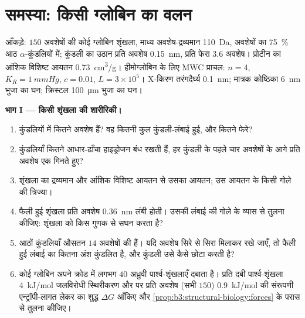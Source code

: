 \section{समस्या: किसी ग्लोबिन का वलन}

\begin{problem}
\label{pb:b3:structural-biology:1}
आँकड़े: $150$ अवशेषों की कोई ग्लोबिन शृंखला, माध्य अवशेष-द्रव्यमान \qty{110}{Da},
अवशेषों का \qty{75}{\%} आठ $\alpha$-कुंडलियों में; कुंडली का उठान
प्रति अवशेष \qty{0.15}{nm}, प्रति फेरा $3.6$ अवशेष। प्रोटीन का आंशिक
विशिष्ट आयतन \qty{0.73}{cm^3/g}। हीमोग्लोबिन के लिए MWC प्राचल:
$n = 4$, $K_{R} = \qty{1}{mmHg}$, $c = 0.01$, $L = 3\times 10^{5}$।
X-किरण तरंगदैर्घ्य \qty{0.1}{nm}; मात्रक कोष्ठिका \qty{6}{nm} भुजा का घन;
क्रिस्टल \qty{100}{\micro m} भुजा का घन।

\medskip
\noindent\textbf{भाग I --- किसी शृंखला की शारीरिकी।}
\begin{enumerate}
  \item कुंडलियों में कितने अवशेष हैं? वह कितनी कुल कुंडली-लंबाई हुई,
        और कितने फेरे?
  \item कुंडलियाँ कितने आधार-ढाँचा हाइड्रोजन बंध रखती हैं, हर कुंडली
        के पहले चार अवशेषों के आगे प्रति अवशेष एक गिनते हुए?
  \item शृंखला का द्रव्यमान और आंशिक विशिष्ट आयतन से उसका आयतन; उस
        आयतन के किसी गोले की त्रिज्या।
  \item फैली हुई शृंखला प्रति अवशेष \qty{0.36}{nm} लंबी होती।
        उसकी लंबाई की गोले के व्यास से तुलना कीजिए:  शृंखला को
        किस गुणक से सघन करता है?
  \item आठों कुंडलियाँ औसतन $14$ अवशेषों की हैं। यदि अवशेष सिरे से
        सिरा मिलाकर रखे जाएँ, तो फैली हुई लंबाई का कितना अंश कुंडलित
        है, और कुंडली उसे कैसे छोटा करती है?
  \item कोई ग्लोबिन अपने क्रोड में लगभग $40$ अध्रुवी पार्श्व-शृंखलाएँ
        दबाता है। प्रति दबी पार्श्व-शृंखला \qty{4}{kJ/mol} जलविरोधी
        स्थिरीकरण और  पर प्रति अवशेष (सभी $150$)
        \qty{0.9}{kJ/mol} की संरूपणी एन्ट्रॉपी-लागत लेकर
         का शुद्ध $\Delta G$ आँकिए और
        \cref{prop:b3:structural-biology:forces} के परास से तुलना कीजिए।
\end{enumerate}


\end{problem}
